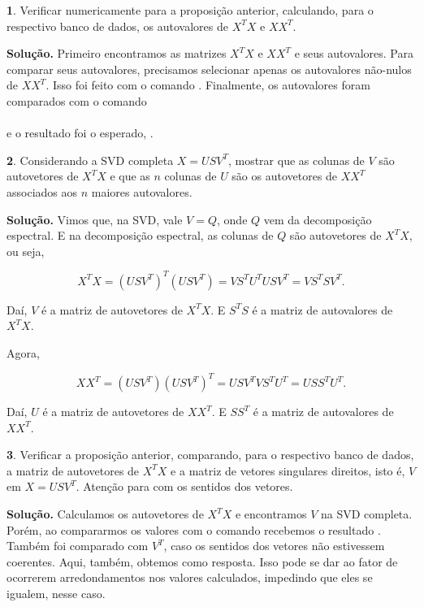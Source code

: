\documentclass[a4paper, 12pt]{article}
\theoremstyle{definition}
\newtheorem{questao}{}
\newenvironment{solucao}{\noindent\textbf{Solução.}}{}
\theoremstyle{remark}
\begin{document}
\begin{questao}
    Verificar numericamente para a proposição anterior, calculando, para o respectivo banco de dados, os autovalores de $X^TX$ e $XX^T$.
\end{questao}

\begin{solucao}
    Primeiro encontramos as matrizes $X^TX$ e $XX^T$ e seus autovalores. Para comparar seus autovalores, precisamos selecionar apenas os autovalores não-nulos de $XX^T$. Isso foi feito com o comando . Finalmente, os autovalores foram comparados com o comando\\\\e o resultado foi o esperado, .
\end{solucao}

\begin{questao}
    Considerando a SVD completa $X = USV^T$, mostrar que as colunas de $V$ são autovetores de $X^TX$ e que as $n$ colunas de $U$ são os autovetores de $XX^T$ associados aos $n$ maiores autovalores.
\end{questao}

\begin{solucao}
    Vimos que, na SVD, vale $V = Q$, onde $Q$ vem da decomposição espectral. E na decomposição espectral, as colunas de 
    $Q$ são autovetores de $X^TX$, ou seja,
    
    $$X^TX = (USV^T)^T(USV^T) = VS^TU^TUSV^T = VS^TSV^T.$$
    
    Daí, $V$ é a matriz de autovetores de $X^TX$. E $S^TS$ é a matriz de autovalores de $X^TX$.
    
    Agora,
    
    $$XX^T = (USV^T)(USV^T)^T = USV^TVS^TU^T = USS^TU^T.$$
    
    Daí, $U$ é a matriz de autovetores de $XX^T$. E $SS^T$ é a matriz de autovalores de $XX^T$.
\end{solucao}

\begin{questao}
    Verificar a proposição anterior, comparando, para o respectivo banco de dados, a matriz de autovetores de $X^TX$ e a matriz de vetores singulares direitos, isto é, $V$ em $X = USV^T$. Atenção para com os sentidos dos vetores.
\end{questao}

\begin{solucao}
    Calculamos os autovetores de $X^TX$ e encontramos $V$ na SVD completa. Porém, ao compararmos os valores com o comando  recebemos o resultado . Também foi comparado com $V^T$, caso os sentidos dos vetores não estivessem coerentes. Aqui, também, obtemos  como resposta. Isso pode se dar ao fator de ocorrerem arredondamentos nos valores calculados, impedindo que eles se igualem, nesse caso.
\end{solucao}
\end{document}
